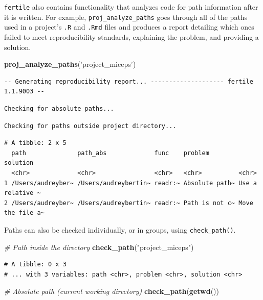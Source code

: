 \documentclass[12pt,twoside]{reedthesis}
\newenvironment{Shaded}{\begin{snugshade}}{\end{snugshade}}
\newcommand{\CommentTok}[1]{\textcolor[rgb]{0.56,0.35,0.01}{\textit{#1}}}
\newcommand{\KeywordTok}[1]{\textcolor[rgb]{0.13,0.29,0.53}{\textbf{#1}}}
\newcommand{\NormalTok}[1]{#1}
\newcommand{\StringTok}[1]{\textcolor[rgb]{0.31,0.60,0.02}{#1}}
\begin{document}
\texttt{fertile} also contains functionality that analyzes code for path information after it is written. For example, \texttt{proj\_analyze\_paths} goes through all of the paths used in a project's \texttt{.R} and \texttt{.Rmd} files and produces a report detailing which ones failed to meet reproducibility standards, explaining the problem, and providing a solution.
\begin{Shaded}
\begin{Highlighting}[]
\KeywordTok{proj_analyze_paths}\NormalTok{(}\StringTok{'project_miceps'}\NormalTok{)}
\end{Highlighting}
\end{Shaded}
\begin{verbatim}
-- Generating reproducibility report... -------------------- fertile 1.1.9003 --
\end{verbatim}
\begin{verbatim}
Checking for absolute paths...
\end{verbatim}
\begin{verbatim}
Checking for paths outside project directory...
\end{verbatim}
\begin{verbatim}
# A tibble: 2 x 5
  path              path_abs             func    problem        solution        
  <chr>             <chr>                <chr>   <chr>          <chr>           
1 /Users/audreyber~ /Users/audreybertin~ readr:~ Absolute path~ Use a relative ~
2 /Users/audreyber~ /Users/audreybertin~ readr:~ Path is not c~ Move the file a~
\end{verbatim}
Paths can also be checked individually, or in groups, using \texttt{check\_path()}.
\begin{Shaded}
\begin{Highlighting}[]
\CommentTok{# Path inside the directory}
\KeywordTok{check_path}\NormalTok{(}\StringTok{"project_miceps"}\NormalTok{)}
\end{Highlighting}
\end{Shaded}
\begin{verbatim}
# A tibble: 0 x 3
# ... with 3 variables: path <chr>, problem <chr>, solution <chr>
\end{verbatim}
\begin{Shaded}
\begin{Highlighting}[]
\CommentTok{# Absolute path (current working directory)}
\KeywordTok{check_path}\NormalTok{(}\KeywordTok{getwd}\NormalTok{())}
\end{Highlighting}
\end{Shaded}
\end{document}
